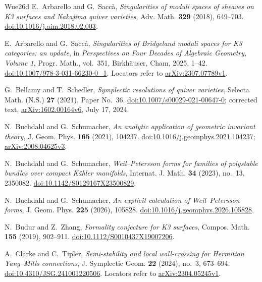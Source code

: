 \begin{thebibliography}{Wue26d}
E.~Arbarello and G.~Sacc\`a,
\textit{Singularities of moduli spaces of sheaves on K3 surfaces and
Nakajima quiver varieties}, Adv. Math. \textbf{329} (2018), 649--703.
\href{https://doi.org/10.1016/j.aim.2018.02.003}{doi:10.1016/j.aim.2018.02.003}.

E.~Arbarello and G.~Sacc\`a,
\textit{Singularities of Bridgeland moduli spaces for K3 categories: an update},
in \textit{Perspectives on Four Decades of Algebraic Geometry, Volume 1},
Progr. Math., vol.~351, Birkh\"auser, Cham, 2025, 1--42.
\href{https://doi.org/10.1007/978-3-031-66230-0_1}{doi:10.1007/978-3-031-66230-0\_1}.
Locators refer to \href{https://arxiv.org/abs/2307.07789v1}{arXiv:2307.07789v1}.

G.~Bellamy and T.~Schedler, \textit{Symplectic resolutions of quiver
varieties}, Selecta Math. (N.S.) \textbf{27} (2021), Paper No.~36.
\href{https://doi.org/10.1007/s00029-021-00647-0}{doi:10.1007/s00029-021-00647-0};
corrected text, \href{https://arxiv.org/abs/1602.00164v6}{arXiv:1602.00164v6},
July 17, 2024.

N.~Buchdahl and G.~Schumacher,
\textit{An analytic application of geometric invariant theory},
J. Geom. Phys. \textbf{165} (2021), 104237.
\href{https://doi.org/10.1016/j.geomphys.2021.104237}{doi:10.1016/j.geomphys.2021.104237};
\href{https://arxiv.org/abs/2008.04625v3}{arXiv:2008.04625v3}.

N.~Buchdahl and G.~Schumacher,
\textit{Weil--Petersson forms for families of polystable bundles over
compact K\"ahler manifolds},
Internat. J. Math. \textbf{34} (2023), no.~13, 2350082.
\href{https://doi.org/10.1142/S0129167X23500829}{doi:10.1142/S0129167X23500829}.

N.~Buchdahl and G.~Schumacher,
\textit{An explicit calculation of Weil--Petersson forms},
J. Geom. Phys. \textbf{225} (2026), 105828.
\href{https://doi.org/10.1016/j.geomphys.2026.105828}{doi:10.1016/j.geomphys.2026.105828}.

N.~Budur and Z.~Zhang, \textit{Formality conjecture for K3 surfaces},
Compos. Math. \textbf{155} (2019), 902--911.
\href{https://doi.org/10.1112/S0010437X19007206}{doi:10.1112/S0010437X19007206}.

A.~Clarke and C.~Tipler,
\textit{Semi-stability and local wall-crossing for Hermitian Yang--Mills connections},
J. Symplectic Geom. \textbf{22} (2024), no.~3, 673--694.
\href{https://doi.org/10.4310/JSG.241001220506}{doi:10.4310/JSG.241001220506}.
Locators refer to \href{https://arxiv.org/abs/2304.05245v1}{arXiv:2304.05245v1}.


\end{thebibliography}

